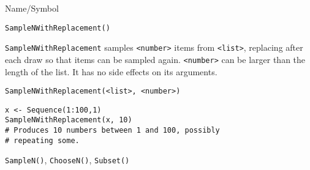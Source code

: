 \begin{desc}{Name/Symbol}
\item[Name/Symbol] 	\verb+SampleNWithReplacement()+

\item[Description] \verb+SampleNWithReplacement+ samples
  \verb+<number>+ items from \verb+<list>+, replacing after each draw
  so that items can be sampled again.  \verb+<number>+ can be larger
  than the length of the list. It has no side effects on its
  arguments.  
\item[Usage]        	
\begin{verbatim}
SampleNWithReplacement(<list>, <number>)
\end{verbatim}

\item[Example] 	
\begin{verbatim}
x <- Sequence(1:100,1)
SampleNWithReplacement(x, 10)
# Produces 10 numbers between 1 and 100, possibly 
# repeating some.
\end{verbatim}

\item[See Also]     	\verb+SampleN()+, \verb+ChooseN()+, \verb+Subset()+
\end{desc}

